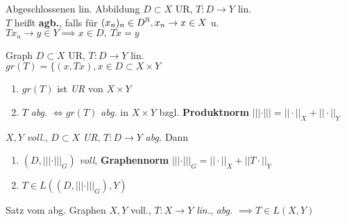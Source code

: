 \begin{definition}{Abgeschlossenen lin. Abbildung}
  $D\subset X$ UR, $T:D \to Y$ lin.\\
  $T$ heißt \textbf{agb.}, falls für $(x_n)_n \in D^{\mathbb{N}}, x_n \to x \in X$ u.
  $Tx_n \to y \in Y \implies x \in D,\ Tx = y $
\end{definition}

\begin{definition}{Graph}
  $D\subset X$ UR, $T:D \to Y$ lin.\\
  $gr(T)=\{(x,Tx), x\in D \subset X \times Y$
\end{definition}

\begin{bemerkung}
  \begin{enumerate}[label=(\roman*)]
    \item $gr(T)$ ist \textit{UR} von $X \times Y$
    \item $T$ \textit{abg.} $\Leftrightarrow gr(T)$ \textit{abg.} in
      $X \times Y$ bzgl. \textbf{Produktnorm}
      $|||\cdot||| = ||\cdot||_X + ||\cdot||_Y$
  \end{enumerate}
\end{bemerkung}

\begin{lemma}
  $X,Y$ \textit{voll.}, $D\subset X$ \textit{UR}, $T:D \to Y$ \textit{abg.}
  Dann
  \begin{enumerate}[label=(\roman*)]
    \item $(D,|||\cdot|||_G)$ \textit{voll}, \textbf{Graphennorm}
      $|||\cdot|||_G = ||\cdot||_X+||T\cdot||_Y$
    \item $T\in L((D,|||\cdot|||_G) ,Y)$
  \end{enumerate}
\end{lemma}

\begin{satz}{Satz vom abg. Graphen}
  $X,Y$ voll., $T:X \to Y$ \textit{lin.}, \textit{abg.}
  $\implies T\in L(X,Y)$
\end{satz}
